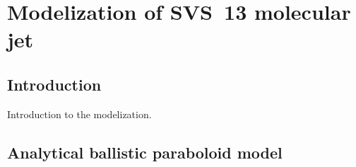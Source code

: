 \documentclass[12pt]{mythesis}
\begin{document}
\chapter{Modelization of SVS~13 molecular jet}

\section{Introduction}

Introduction to the modelization.






\section{Analytical ballistic paraboloid model}\label{sec:paraboloid}
\end{document}
